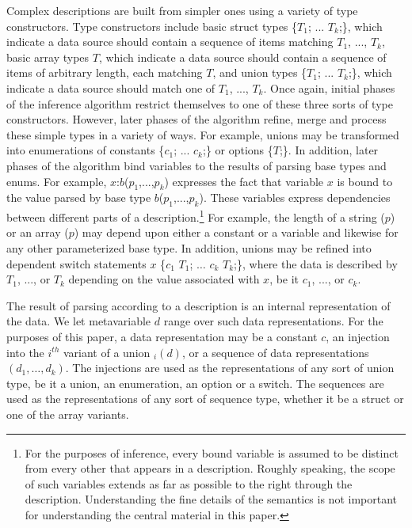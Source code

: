 Complex descriptions are built from simpler ones using a variety of
type constructors.  Type constructors include
basic struct types \{$T_1$; ... $T_k$;\}, which indicate a
data source
should contain a sequence of items matching $T_1$, ..., $T_k$,
basic array types  $T$, which indicate a data source should contain
a sequence of items of arbitrary length, each matching $T$,
and union types  \{$T_1$; ... $T_k$;\}, which indicate a
data source
should match one of $T_1$, ..., $T_k$.  Once again, initial phases
of the inference algorithm restrict themselves to one of these three
sorts of type constructors.  However, later phases of the algorithm
refine, merge and process these simple types in a variety of ways.
For example, unions may be transformed into 
enumerations of constants
 \{$c_1$; ... $c_k$;\}
or options  \{$T$;\}.  In
addition, later phases of the algorithm 
bind variables to the results of parsing 
base types and enums.  For example, $x$:$b$($p_1$,...,$p_k$) expresses the fact that
variable $x$ is bound to the value parsed by base type
$b$($p_1$,...,$p_k$).  These variables express dependencies between 
different parts
of a description.\footnote{For the purposes of inference, 
every bound variable is assumed to be distinct
from every other that appears in a description.  Roughly speaking,
the scope of such variables
extends as far as possible to the right through the description.
Understanding the fine details of the semantics is not important
for understanding the central material in this paper.}  
For example, the length of a string ($p$)
or an array ($p$) may depend upon either a constant or
a variable and likewise for any other parameterized base type.  In
addition, unions may be refined into dependent switch statements
 $x$  \{$c_1$ \cd{=>} $T_1$; $\ldots$ $c_k$ \cd{=>} $T_k$;\}, where the
data is described by $T_1$, ..., or $T_k$ depending on the value
associated with $x$, be it $c_1$, ..., or $c_k$.

The result of parsing according to a description is an internal
representation of the data. We let metavariable $d$ range over such 
data representations.  For the purposes of this paper, a data 
representation may be a constant $c$, an injection into the $i^{th}$
variant of a union $_i(d)$, or a sequence of data representations
$(d_1,\ldots,d_k)$.  The injections are used as the representations of
any sort of union type, be it a union, an enumeration, an option or a switch.
The sequences are used as the representations of any sort of sequence
type, whether it be a struct or one of the array variants.

